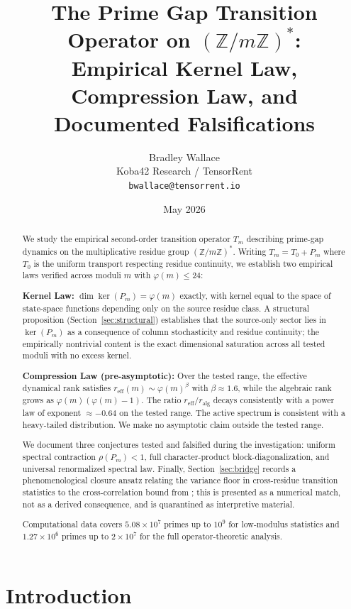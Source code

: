 \documentclass[11pt,a4paper]{article}
\title{The Prime Gap Transition Operator on $(\mathbb{Z}/m\mathbb{Z})^*$:\\
Empirical Kernel Law, Compression Law, and Documented Falsifications}
\author{Bradley Wallace\\
Koba42 Research / TensorRent\\
\texttt{bwallace@tensorrent.io}}
\date{May 2026}
\begin{document}
\maketitle

\begin{abstract}
We study the empirical second-order transition operator $T_m$ describing prime-gap dynamics on the multiplicative residue group $(\mathbb{Z}/m\mathbb{Z})^*$. Writing $T_m = T_0 + P_m$ where $T_0$ is the uniform transport respecting residue continuity, we establish two empirical laws verified across moduli $m$ with $\varphi(m) \leq 24$:

\textbf{Kernel Law:} $\dim \ker(P_m) = \varphi(m)$ exactly, with kernel equal to the space of state-space functions depending only on the source residue class. A structural proposition (Section~\ref{sec:structural}) establishes that the source-only sector lies in $\ker(P_m)$ as a consequence of column stochasticity and residue continuity; the empirically nontrivial content is the exact dimensional saturation across all tested moduli with no excess kernel.

\textbf{Compression Law (pre-asymptotic):} Over the tested range, the effective dynamical rank satisfies $r_{\text{eff}}(m) \sim \varphi(m)^{\beta}$ with $\beta \approx 1.6$, while the algebraic rank grows as $\varphi(m)(\varphi(m)-1)$. The ratio $r_{\text{eff}}/r_{\text{alg}}$ decays consistently with a power law of exponent $\approx -0.64$ on the tested range. The active spectrum is consistent with a heavy-tailed distribution. We make no asymptotic claim outside the tested range.

We document three conjectures tested and falsified during the investigation: uniform spectral contraction $\rho(P_m) < 1$, full character-product block-diagonalization, and universal renormalized spectral law. Finally, Section~\ref{sec:bridge} records a phenomenological closure ansatz relating the variance floor in cross-residue transition statistics to the cross-correlation bound from \cite{WallaceB}; this is presented as a numerical match, not as a derived consequence, and is quarantined as interpretive material.

Computational data covers $5.08 \times 10^7$ primes up to $10^9$ for low-modulus statistics and $1.27 \times 10^6$ primes up to $2 \times 10^7$ for the full operator-theoretic analysis.
\end{abstract}

\section{Introduction}
\label{sec:intro}
\end{document}
